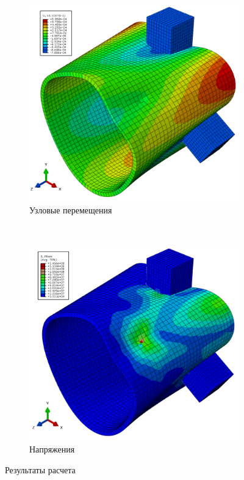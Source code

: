 \documentclass[14pt,oneside,final]{extreport}
\begin{document}
	\begin{figure}[h!]
		\centering
		\begin{subfigure}[t]{0.5\textwidth}
			\centering
			\includegraphics[scale=0.27]{img/diagram-displ}
			\caption{Узловые перемещения} \label{fig:digram-displ}
		\end{subfigure}%
		~ 
		\begin{subfigure}[t]{0.5\textwidth}
			\centering
			\includegraphics[scale=0.27]{img/diagram-stress} 
			\caption{Напряжения} \label{fig:digram-stress}
		\end{subfigure}
		\caption{Результаты расчета} \label{fig:abaqus-results}
	\end{figure} 
\end{document}
